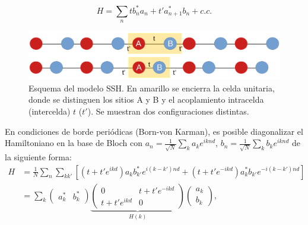 \begin{equation*}
	H = \sum_n t b_n^*a_n + t'  a_{n+1}^*b_n  + c.c.
\end{equation*}



\begin{figure}[h]
\centering
	\includegraphics[width=\linewidth]{media/ssh-model.png}
	\caption[Esquema del modelo SSH.]{Esquema del modelo SSH. En amarillo se encierra la celda unitaria, donde se distinguen los sitios A y B y el acoplamiento intracelda (intercelda) $t$ ($t'$). Se muestran dos configuraciones distintas. \label{fig:ssh-model}}
\end{figure}
En condiciones de borde periódicas (Born-von Karman), es posible diagonalizar el Hamiltoniano en la base de Bloch con $a_n = \frac{1}{\sqrt{N}}\sum_k a_k e^{iknd}$, $b_n = \frac{1}{\sqrt{N}}\sum_k b_k e^{iknd}$ de la siguiente forma:
\begin{align*}
	H &= \frac{1}{N}\sum_n \sum_{k k'} \left[\left(t + t' e^{ikd}\right) a_k b_{k'}^* e^{i(k-k')nd}  + \left(t  + t' e^{-ikd}\right) a_k^* b_{k'} e^{-i(k-k')nd} \right]
	\\
	&=  \sum_k 
	\begin{pmatrix}
		a_k^* & b_k^*		
	\end{pmatrix}
	\underbrace{
	\begin{pmatrix}
		0 & t+ t'e^{-ikd}
		\\
		t+ t'e^{ikd} & 0
	\end{pmatrix}}_{H(k)}
	\begin{pmatrix}
		a_k
		\\
		b_k		
	\end{pmatrix},
\end{align*}
